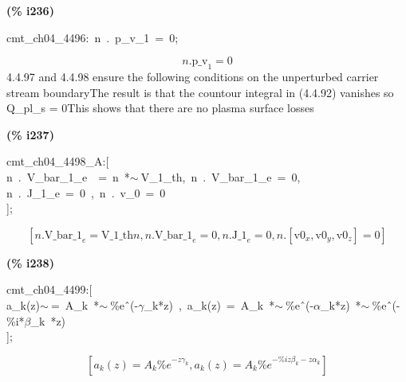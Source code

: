 \documentclass[fleqn]{article}
\begin{document}
\noindent
\begin{minipage}[t]{4.000000em}\color{red}\bfseries
(\% i236)	
\end{minipage}
\begin{minipage}[t]{\textwidth}\color{blue}
cmt\_ch04\_4496:\ n\ .\ p\_v\_1\ =\ 0;
\end{minipage}
\[\displaystyle \tag{\% o236} 
n\ensuremath{\mathrm{ . }}{{\ensuremath{\mathrm{p\_ v}}}_1}=0\mbox{}
\]
4.4.97 and 4.4.98 ensure the following conditions on the unperturbed carrier stream boundaryThe result is that the countour integral in (4.4.92) vanishes so Q\_pl\_s = 0This shows that there are no plasma surface losses


\noindent
\begin{minipage}[t]{4.000000em}\color{red}\bfseries
(\% i237)	
\end{minipage}
\begin{minipage}[t]{\textwidth}\color{blue}
cmt\_ch04\_4498\_A:[\\
n\ .\ V\_bar\_1\_e\ \ =\ n\ *\ensuremath{\sim\ }V\_1\_th,\ n\ .\ V\_bar\_1\_e\ =\ 0,\\
n\ .\ J\_1\_e\ =\ 0\ ,\ n\ .\ v\_0\ =\ 0\ \ \ \ \\
];
\end{minipage}
\[\displaystyle \tag{\% o237} 
\left[ n\ensuremath{\mathrm{ . }}{{\ensuremath{\mathrm{V\_ bar\_ 1}}}_e}=\ensuremath{\mathrm{V\_ 1\_ th}} n\operatorname{,}n\ensuremath{\mathrm{ . }}{{\ensuremath{\mathrm{V\_ bar\_ 1}}}_e}=0\operatorname{,}n\ensuremath{\mathrm{ . }}{{\ensuremath{\mathrm{J\_ 1}}}_e}=0\operatorname{,}n\ensuremath{\mathrm{ . }}\left[ {{\ensuremath{\mathrm{v0}}}_x}\operatorname{,}{{\ensuremath{\mathrm{v0}}}_y}\operatorname{,}{{\ensuremath{\mathrm{v0}}}_z}\right] =0\right] \mbox{}
\]


\noindent
\begin{minipage}[t]{4.000000em}\color{red}\bfseries
(\% i238)	
\end{minipage}
\begin{minipage}[t]{\textwidth}\color{blue}
cmt\_ch04\_4499:[\\
a\_k(z)\ensuremath{\sim\ }=\ A\_k\ *\ensuremath{\sim\ }\%e\^\ (-\ensuremath{\gamma}\_k*z)\ ,\ a\_k(z)\ =\ A\_k\ *\ensuremath{\sim\ }\%e\^\ (-\ensuremath{\alpha}\_k*z)\ *\ensuremath{\sim\ }\%e\^\ (-\%i*\ensuremath{\beta}\_k\ *z)\\
];
\end{minipage}
\[\displaystyle \tag{\% o238} 
\left[ {a_k}(z)={A_k} {{\% e}^{-z {{\gamma }_k}}}\operatorname{,}{a_k}(z)={A_k} {{\% e}^{-\% i z {{\beta }_k}-z {{\alpha }_k}}}\right] \mbox{}
\]
\end{document}

